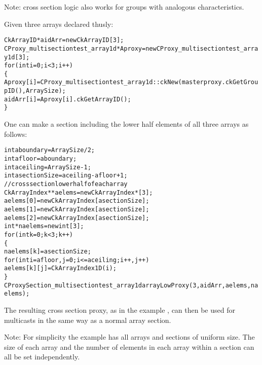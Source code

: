Note: cross section logic also works for groups with analogous characteristics.

Given three arrays declared thusly:

\begin{alltt}
	  CkArrayID *aidArr= new CkArrayID[3];
	  CProxy\_multisectiontest\_array1d *Aproxy= new CProxy\_multisectiontest\_array1d[3];
	  for(int i=0;i<3;i++)
	    \{
	      Aproxy[i]=CProxy\_multisectiontest\_array1d::ckNew(masterproxy.ckGetGroupID(),ArraySize);	  
	      aidArr[i]=Aproxy[i].ckGetArrayID();
	    \}
\end{alltt}

One can make a section including the  lower half elements of all three
arrays as follows:

\begin{alltt}
	  int aboundary=ArraySize/2;
	  int afloor=aboundary;
	  int aceiling=ArraySize-1;
	  int asectionSize=aceiling-afloor+1;
	  // cross section lower half of each array
	  CkArrayIndex **aelems= new CkArrayIndex*[3];
	  aelems[0]= new CkArrayIndex[asectionSize];
	  aelems[1]= new CkArrayIndex[asectionSize];
	  aelems[2]= new CkArrayIndex[asectionSize];
	  int *naelems=new int[3];
	  for(int k=0;k<3;k++)
	    \{
	      naelems[k]=asectionSize;
	      for(int i=afloor,j=0;i<=aceiling;i++,j++)
	        aelems[k][j]=CkArrayIndex1D(i);
	    \}
	  CProxySection\_multisectiontest\_array1d arrayLowProxy(3,aidArr,aelems,naelems);
\end{alltt}



The resulting cross section proxy, as in the example ,
can then be used for multicasts in the same way as a normal array
section.

Note: For simplicity the example has all arrays and sections of uniform
size.  The size of each array and the number of elements in each array
within a section can all be set independently.


